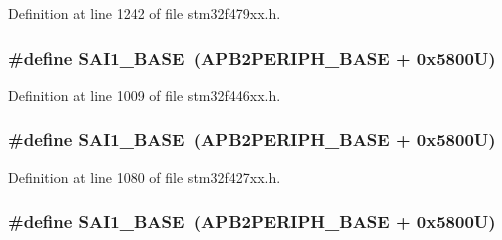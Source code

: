 Definition at line 1242 of file stm32f479xx.\+h.

\subsubsection[{\texorpdfstring{S\+A\+I1\+\_\+\+B\+A\+SE}{SAI1_BASE}}]{\setlength{\rightskip}{0pt plus 5cm}\#define S\+A\+I1\+\_\+\+B\+A\+SE~({\bf A\+P\+B2\+P\+E\+R\+I\+P\+H\+\_\+\+B\+A\+SE} + 0x5800\+U)}\hypertarget{group___peripheral__memory__map_ga24c1053b754946b512f9c31123e09d21}{}\label{group___peripheral__memory__map_ga24c1053b754946b512f9c31123e09d21}


Definition at line 1009 of file stm32f446xx.\+h.

\subsubsection[{\texorpdfstring{S\+A\+I1\+\_\+\+B\+A\+SE}{SAI1_BASE}}]{\setlength{\rightskip}{0pt plus 5cm}\#define S\+A\+I1\+\_\+\+B\+A\+SE~({\bf A\+P\+B2\+P\+E\+R\+I\+P\+H\+\_\+\+B\+A\+SE} + 0x5800\+U)}\hypertarget{group___peripheral__memory__map_ga24c1053b754946b512f9c31123e09d21}{}\label{group___peripheral__memory__map_ga24c1053b754946b512f9c31123e09d21}


Definition at line 1080 of file stm32f427xx.\+h.

\subsubsection[{\texorpdfstring{S\+A\+I1\+\_\+\+B\+A\+SE}{SAI1_BASE}}]{\setlength{\rightskip}{0pt plus 5cm}\#define S\+A\+I1\+\_\+\+B\+A\+SE~({\bf A\+P\+B2\+P\+E\+R\+I\+P\+H\+\_\+\+B\+A\+SE} + 0x5800\+U)}\hypertarget{group___peripheral__memory__map_ga24c1053b754946b512f9c31123e09d21}{}\label{group___peripheral__memory__map_ga24c1053b754946b512f9c31123e09d21}


